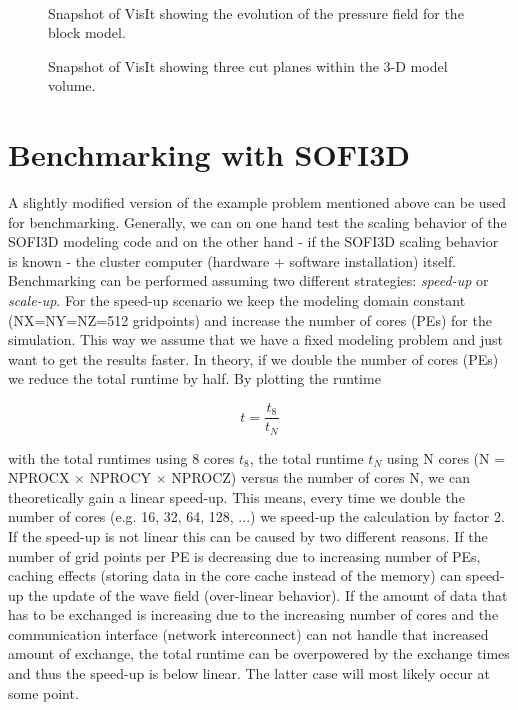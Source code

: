 \documentclass[11pt,onecolumn,oneside]{article}
\begin{document}
\begin{figure}[ht]
\begin{center}
\\
\caption{\label{first_movie_1.pdf} Snapshot of VisIt showing the evolution of the pressure field for the block model.}
\end{center}
\end{figure}

\begin{figure}[ht]
\begin{center}
\caption{\label{three_cut_planes.pdf} Snapshot of VisIt showing three cut planes within the 3-D model volume.}
\end{center}
\end{figure}
\clearpage

\section{Benchmarking with SOFI3D}
\label{benchmark_sofi3D}

A slightly modified version of the example problem mentioned above can be used for benchmarking. Generally, we can on one hand test the scaling behavior of the SOFI3D modeling code and on the other hand - if the SOFI3D scaling behavior is known - the cluster computer (hardware + software installation) itself. Benchmarking can be performed assuming two different strategies: \textit{speed-up} or \textit{scale-up}. For the speed-up scenario we keep the modeling domain constant (NX=NY=NZ=512 gridpoints) and increase the number of cores (PEs) for the simulation. This way we assume that we have a fixed modeling problem and just want to get the results faster. In theory, if we double the number of cores (PEs) we reduce the total runtime by half. By plotting the runtime 

\begin{equation}
t = \frac{t_8}{t_N} \label{eq_speedup}
\end{equation}


with the total runtimes using 8 cores $t_8$, the total runtime $t_N$ using N cores (N = NPROCX $\times $ NPROCY $\times$ NPROCZ) versus the number of cores N, we can theoretically gain a linear speed-up. This means, every time we double the number of cores (e.g. 16, 32, 64, 128, ...) we speed-up the calculation by factor 2. If the speed-up is not linear this can be caused by two different reasons. If the number of grid points per PE is decreasing due to increasing number of PEs, caching effects (storing data in the core cache instead of the memory) can speed-up the update of the wave field (over-linear behavior). If the amount of data that has to be exchanged is increasing due to the increasing number of cores and the communication interface (network interconnect) can not handle that increased amount of exchange, the total runtime can be overpowered by the exchange times and thus the speed-up is below linear. The latter case will most likely occur at some point. 
\end{document}
